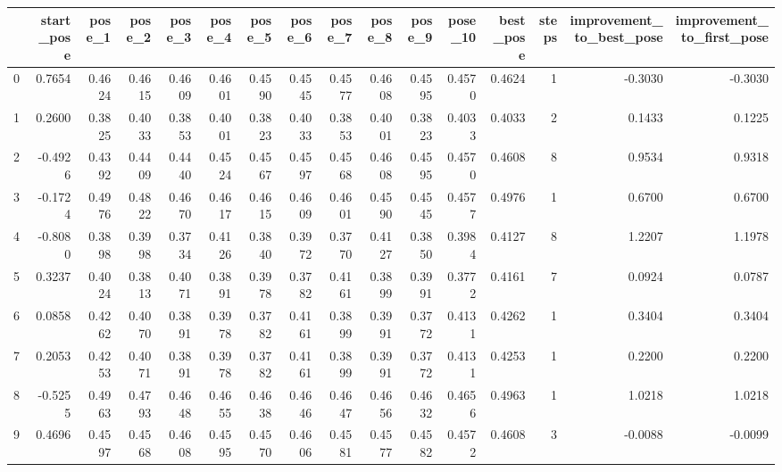 \begin{tabular}{lrrrrrrrrrrrrrrr}
\toprule
{} &  start\_pose &  pose\_1 &  pose\_2 &  pose\_3 &  pose\_4 &  pose\_5 &  pose\_6 &  pose\_7 &  pose\_8 &  pose\_9 &  pose\_10 &  best\_pose &  steps &  improvement\_to\_best\_pose &  improvement\_to\_first\_pose \\
\midrule
0 &      0.7654 &  0.4624 &  0.4615 &  0.4609 &  0.4601 &  0.4590 &  0.4545 &  0.4577 &  0.4608 &  0.4595 &   0.4570 &     0.4624 &      1 &                   -0.3030 &                    -0.3030 \\
1 &      0.2600 &  0.3825 &  0.4033 &  0.3853 &  0.4001 &  0.3823 &  0.4033 &  0.3853 &  0.4001 &  0.3823 &   0.4033 &     0.4033 &      2 &                    0.1433 &                     0.1225 \\
2 &     -0.4926 &  0.4392 &  0.4409 &  0.4440 &  0.4524 &  0.4567 &  0.4597 &  0.4568 &  0.4608 &  0.4595 &   0.4570 &     0.4608 &      8 &                    0.9534 &                     0.9318 \\
3 &     -0.1724 &  0.4976 &  0.4822 &  0.4670 &  0.4617 &  0.4615 &  0.4609 &  0.4601 &  0.4590 &  0.4545 &   0.4577 &     0.4976 &      1 &                    0.6700 &                     0.6700 \\
4 &     -0.8080 &  0.3898 &  0.3998 &  0.3734 &  0.4126 &  0.3840 &  0.3972 &  0.3770 &  0.4127 &  0.3850 &   0.3984 &     0.4127 &      8 &                    1.2207 &                     1.1978 \\
5 &      0.3237 &  0.4024 &  0.3813 &  0.4071 &  0.3891 &  0.3978 &  0.3782 &  0.4161 &  0.3899 &  0.3991 &   0.3772 &     0.4161 &      7 &                    0.0924 &                     0.0787 \\
6 &      0.0858 &  0.4262 &  0.4070 &  0.3891 &  0.3978 &  0.3782 &  0.4161 &  0.3899 &  0.3991 &  0.3772 &   0.4131 &     0.4262 &      1 &                    0.3404 &                     0.3404 \\
7 &      0.2053 &  0.4253 &  0.4071 &  0.3891 &  0.3978 &  0.3782 &  0.4161 &  0.3899 &  0.3991 &  0.3772 &   0.4131 &     0.4253 &      1 &                    0.2200 &                     0.2200 \\
8 &     -0.5255 &  0.4963 &  0.4793 &  0.4648 &  0.4655 &  0.4638 &  0.4646 &  0.4647 &  0.4656 &  0.4632 &   0.4656 &     0.4963 &      1 &                    1.0218 &                     1.0218 \\
9 &      0.4696 &  0.4597 &  0.4568 &  0.4608 &  0.4595 &  0.4570 &  0.4606 &  0.4581 &  0.4577 &  0.4582 &   0.4572 &     0.4608 &      3 &                   -0.0088 &                    -0.0099 \\
\bottomrule
\end{tabular}
